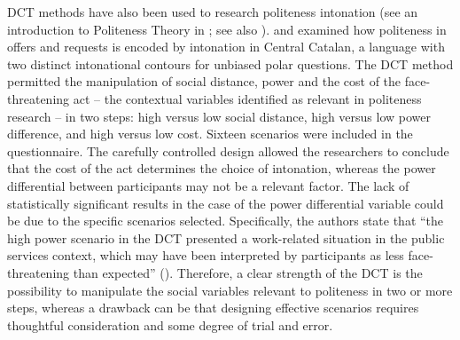 \documentclass[output=paper]{LSP/langsci}
\begin{document}
DCT methods have also been used to research politeness intonation (see an introduction to Politeness Theory in \citealt{Brown1987}; see also \citealt{Astruc2011,Astruc2016offers,Borras-Comes2015,Astruc2016offers}). \citet{Astruc2011} and \citet{Astruc2016offers} examined how politeness in offers and requests is encoded by intonation in Central Catalan, a language with two distinct intonational contours for unbiased polar questions. The DCT method permitted the manipulation of social distance, power and the cost of the face-threatening act -- the contextual variables identified as relevant in politeness research -- in two steps: high versus low social distance, high versus low power difference, and high versus low cost. Sixteen scenarios were included in the questionnaire. The carefully controlled design allowed the researchers to conclude that the cost of the act determines the choice of intonation, whereas the power differential between participants may not be a relevant factor. The lack of statistically significant results in the case of the power differential variable could be due to the specific scenarios selected. Specifically, the authors state that “the high power scenario in the DCT presented a work-related situation in the public services context, which may have been interpreted by participants as less face-threatening than expected” (\citealt[110]{Astruc2016offers}). Therefore, a clear strength of the DCT is the possibility to manipulate the social variables relevant to politeness in two or more steps, whereas a drawback can be that designing effective scenarios requires thoughtful consideration and some degree of trial and error.
\end{document}
